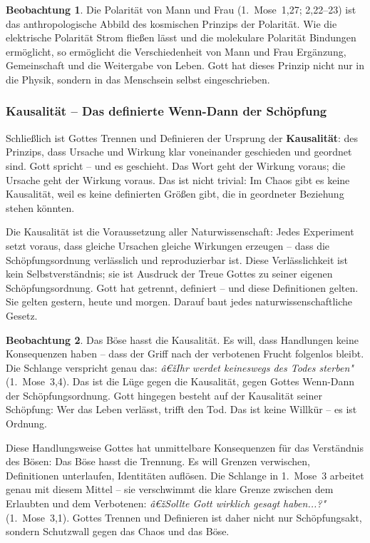 ﻿\documentclass[a4paper,12pt]{article}
\theoremstyle{definition}
\newtheorem{observation}{Beobachtung}[section]
\begin{document}
\begin{observation}
	Die Polarität von Mann und Frau (1.~Mose~1,27; 2,22--23) ist das anthropologische
	Abbild des kosmischen Prinzips der Polarität. Wie die elektrische Polarität
	Strom fließen lässt und die molekulare Polarität Bindungen ermöglicht, so
	ermöglicht die Verschiedenheit von Mann und Frau Ergänzung, Gemeinschaft und
	die Weitergabe von Leben. Gott hat dieses Prinzip nicht nur in die Physik,
	sondern in das Menschsein selbst eingeschrieben.
\end{observation}

\subsubsection{Kausalität -- Das definierte Wenn-Dann der Schöpfung}

Schließlich ist Gottes Trennen und Definieren der Ursprung der \textbf{Kausalität}:
des Prinzips, dass Ursache und Wirkung klar voneinander geschieden und geordnet
sind. Gott spricht -- und es geschieht. Das Wort geht der Wirkung voraus; die
Ursache geht der Wirkung voraus. Das ist nicht trivial: Im Chaos gibt es keine
Kausalität, weil es keine definierten Größen gibt, die in geordneter Beziehung
stehen könnten.

Die Kausalität ist die Voraussetzung aller Naturwissenschaft: Jedes Experiment
setzt voraus, dass gleiche Ursachen gleiche Wirkungen erzeugen -- dass die
Schöpfungsordnung verlässlich und reproduzierbar ist. Diese Verlässlichkeit ist
kein Selbstverständnis; sie ist Ausdruck der Treue Gottes zu seiner eigenen
Schöpfungsordnung. Gott hat getrennt, definiert -- und diese Definitionen gelten.
Sie gelten gestern, heute und morgen. Darauf baut jedes naturwissenschaftliche
Gesetz.

\begin{observation}
	Das Böse hasst die Kausalität. Es will, dass Handlungen keine Konsequenzen
	haben -- dass der Griff nach der verbotenen Frucht folgenlos bleibt. Die
	Schlange verspricht genau das: \textit{â€žIhr werdet keineswegs des Todes sterben"}
	(1.~Mose~3,4). Das ist die Lüge gegen die Kausalität, gegen Gottes Wenn-Dann
	der Schöpfungsordnung. Gott hingegen besteht auf der Kausalität seiner Schöpfung:
	Wer das Leben verlässt, trifft den Tod. Das ist keine Willkür -- es ist Ordnung.
\end{observation}

Diese Handlungsweise Gottes hat unmittelbare Konsequenzen für das Verständnis
des Bösen: Das Böse hasst die Trennung. Es will Grenzen verwischen, Definitionen
unterlaufen, Identitäten auflösen. Die Schlange in 1.~Mose~3 arbeitet genau mit
diesem Mittel -- sie verschwimmt die klare Grenze zwischen dem Erlaubten und dem
Verbotenen: \textit{â€žSollte Gott wirklich gesagt haben...?"} (1.~Mose~3,1).
Gottes Trennen und Definieren ist daher nicht nur Schöpfungsakt, sondern
Schutzwall gegen das Chaos und das Böse.
\end{document}
